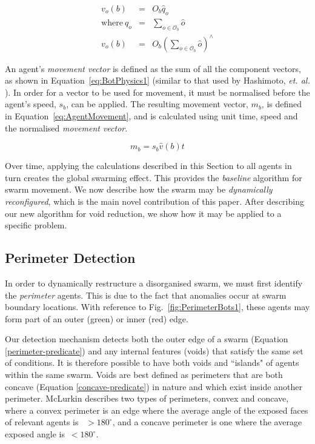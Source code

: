 \documentclass[letterpaper]{article}
\begin{document}
\begin{eqnarray}\label{eq:Obstacle2}
  v_o(b) & = & O_b \hat q_o \\
	\mathrm{where~}  q_o & = & \sum_{o\in \mathcal O_b } \hat o
	\nonumber \\
	v_o(b) & = & O_b \left(\sum_{o\in \mathcal O_b }\hat o\right)^{\!\!\wedge} \nonumber
\end{eqnarray}

An agent's \textit{movement vector} is defined as the sum of all the component vectors, as shown in Equation~\ref{eq:BotPhysics1} (similar to that used by Hashimoto, {\it et. al.} \citep{HAY:08}). In order for a vector to be used for movement, it must be normalised before the agent's speed, $s_b$, can be applied. The resulting movement vector, $m_b$, is defined in Equation~\ref{eq:AgentMovement}, and is calculated using unit time, speed and the normalised \textit{movement vector}.

\begin{equation}\label{eq:AgentMovement}
m_b = s_b  \hat v(b)  t
\end{equation}

Over time, applying the calculations described in this Section to all agents in turn creates the global swarming effect. This provides the {\it baseline} algorithm for swarm movement.
We now describe how the swarm may be {\it dynamically reconfigured}, which is the main novel contribution of this paper. After describing our new algorithm for void reduction, we show how it may be applied to a specific problem.
  
\subsection{Perimeter Detection}
\label{sec:PerimeterDetection}

In order to dynamically restructure a disorganised swarm, we must first identify the {\it perimeter} agents. This is due to the fact that anomalies occur at swarm boundary locations. With reference to Fig.~\ref{fig:PerimeterBots1}, these agents may form part of an outer ({\color{green}green}) or inner ({\color{red}red}) edge.

Our detection mechanism detects both the outer edge of a swarm (Equation \ref{perimeter-predicate}) and any internal features (voids) that satisfy the same set of conditions. It is therefore possible to have both voids and ``islands" of agents within the same swarm. Voids are best defined as perimeters that are both concave (Equation \ref{concave-predicate}) in nature and which exist inside another perimeter. McLurkin \citep{MD:09} describes two types of perimeters, convex and concave, where a convex perimeter is an edge where the average angle of the exposed faces of relevant agents is ~$> 180^\circ$, and a concave perimeter is one where the average exposed angle is~$< 180^\circ$.
\end{document}
